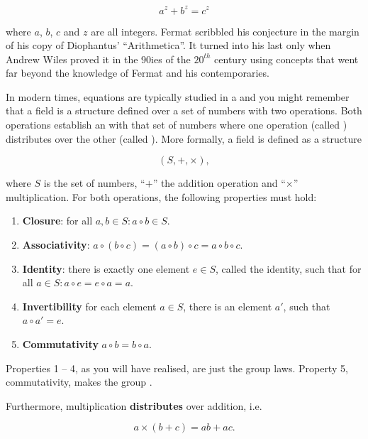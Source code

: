 \documentclass[tikz]{scrreprt}
\begin{document}
\begin{equation} 
a^z + b^z = c^z
\end{equation} 

where $a$, $b$, $c$ and $z$ are all integers.
Fermat scribbled his conjecture
in the margin of his copy of Diophantus' ``Arithmetica''.
It turned
into his last  only when Andrew Wiles
proved it in the 90ies of the $20^{th}$ century
using concepts that went far beyond the knowledge
of Fermat and his contemporaries.

In modern times, equations are typically studied
in a  and you might remember that a field
is a structure defined over a set of numbers with
two operations. Both operations establish an 
with that set of numbers where one operation
(called ) distributes over
the other (called ).
More formally, a field is defined as a structure

\[
(S,+,\times),
\]

where $S$ is the set of numbers, ``$+$'' the addition
operation and ``$\times$'' multiplication.
For both operations, the following properties must hold: 

\begin{enumerate}
\item \textbf{Closure}: 
      for all $a,b \in S: a \circ b \in S$.
      
\item \textbf{Associativity}:
      $a \circ (b \circ c) = (a \circ b) \circ c = a \circ b \circ c$.

\item \textbf{Identity}:
      there is exactly one element $e \in S$, called the identity, such that
      for all $a \in S: a \circ e = e \circ a = a$.

\item \textbf{Invertibility}
      for each element $a \in S$, there is an element $a'$,
      such that $a \circ a' = e$.
      
\item \textbf{Commutativity}
      $a \circ b = b \circ a$.
\end{enumerate}

Properties 1 -- 4, as you will have realised, are just the group laws.
Property 5, commutativity, makes the group .

Furthermore, multiplication \textbf{distributes} over addition, i.e.

\[
a \times (b + c) = ab + ac.
\]
\end{document}
